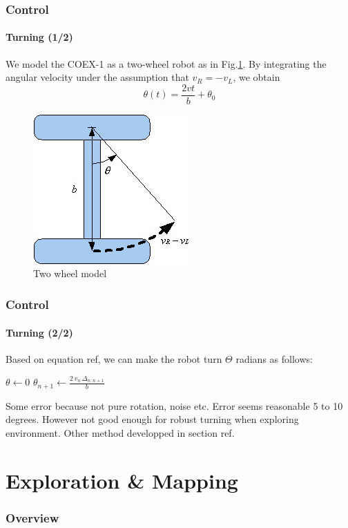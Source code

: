 \documentclass[10pt]{beamer}
\begin{document}

\begin{frame}
\frametitle{Control}
\framesubtitle{Turning (1/2)}
We model the COEX-1 as a two-wheel robot as in Fig.\ref{fig:model-turn}. By integrating the angular velocity under the assumption that $v_R = -v_L$, we obtain 
$$
\theta(t) = \frac{2vt}{b} + \theta_0
$$
\begin{figure}[hbtp]
\centering
\label{fig:model-turn}
\includegraphics[scale=0.45]{figures/differential-system.jpg}
\caption{Two wheel model}
\end{figure}
\end{frame}


\begin{frame}
\frametitle{Control}
\framesubtitle{Turning (2/2)}
Based on equation ref, we can make the robot turn $\Theta$ radians as follows:
\begin{algorithmic}[1]
\State $\theta\gets 0$
\State {}
\While{$\theta < \Theta$}
\State $\theta_{n+1} \gets \frac{2\, v_n\, \Delta_{n:n+1}}{b}$
\EndWhile
\State {}
\end{algorithmic}
Some error because not pure rotation, noise etc. Error seems reasonable 5 to 10 degrees. However not good enough for robust turning when exploring environment. Other method developped in section ref.
\end{frame}


\section{Exploration \& Mapping} 

\begin{frame}
\frametitle{Overview}
\tableofcontents[currentsection,subsectionstyle=shaded]
\end{frame}
\end{document}
